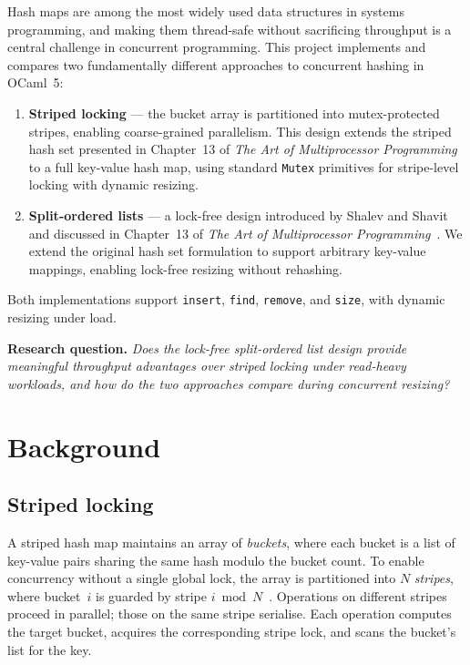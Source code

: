 \documentclass[11pt,a4paper]{article}
\begin{document}
Hash maps are among the most widely used data structures in systems
programming, and making them thread-safe without sacrificing throughput is a
central challenge in concurrent programming. This project implements and
compares two fundamentally different approaches to concurrent hashing in
OCaml~5:
\begin{enumerate}[leftmargin=*]
  \item \textbf{Striped locking} — the bucket array is partitioned into
    mutex-protected stripes, enabling coarse-grained parallelism. This design
    extends the striped hash set presented in Chapter~13 of
    \emph{The Art of Multiprocessor Programming}~\cite{AoMPP} to a full
    key-value hash map, using standard \texttt{Mutex} primitives for
    stripe-level locking with dynamic resizing.
  \item \textbf{Split-ordered lists} — a lock-free design introduced by
    Shalev and Shavit~\cite{ShalevShavit2006} and discussed in Chapter~13
    of \emph{The Art of Multiprocessor Programming}~\cite{AoMPP}. We extend
    the original hash set formulation to support arbitrary key-value
    mappings, enabling lock-free resizing without rehashing.
\end{enumerate}
Both implementations support \texttt{insert}, \texttt{find}, \texttt{remove},
and \texttt{size}, with dynamic resizing under load.
\medskip
\noindent

\textbf{Research question.} \emph{Does the lock-free split-ordered
list design provide meaningful throughput advantages over striped locking under
read-heavy workloads, and how do the two approaches compare during concurrent
resizing?}

\section{Background}
\label{sec:background}
\subsection{Striped locking}

A striped hash map maintains an array of \emph{buckets}, where each bucket is
a list of key-value pairs sharing the same hash modulo the bucket count.
To enable concurrency without a single global lock, the array is partitioned
into $N$ \emph{stripes}, where bucket~$i$ is guarded by stripe $i \bmod
N$~\cite{AoMPP}. Operations on different stripes proceed in parallel; those on
the same stripe serialise. Each operation computes the target bucket, acquires
the corresponding stripe lock, and scans the bucket's list for the key.
\end{document}
